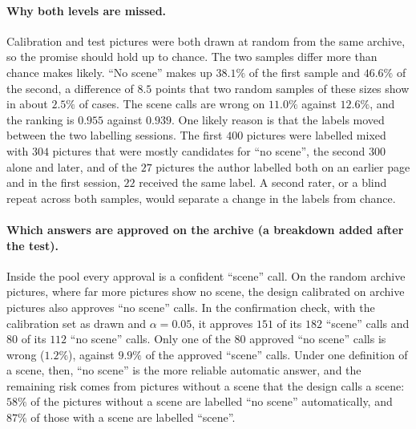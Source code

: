 \paragraph{Why both levels are missed.} Calibration and test pictures were both drawn at random from the same archive, so the promise should hold up to chance. The two samples differ more than chance makes likely. ``No scene'' makes up $38.1\%$ of the first sample and $46.6\%$ of the second, a difference of $8.5$ points that two random samples of these sizes show in about $2.5\%$ of cases. The scene calls are wrong on $11.0\%$ against $12.6\%$, and the ranking is $0.955$ against $0.939$. One likely reason is that the labels moved between the two labelling sessions. The first $400$ pictures were labelled mixed with $304$ pictures that were mostly candidates for ``no scene'', the second $300$ alone and later, and of the $27$ pictures the author labelled both on an earlier page and in the first session, $22$ received the same label. A second rater, or a blind repeat across both samples, would separate a change in the labels from chance.

\paragraph{Which answers are approved on the archive (a breakdown added after the test).} Inside the pool every approval is a confident ``scene'' call. On the random archive pictures, where far more pictures show no scene, the design calibrated on archive pictures also approves ``no scene'' calls. In the confirmation check, with the calibration set as drawn and $\alpha=0.05$, it approves $151$ of its $182$ ``scene'' calls and $80$ of its $112$ ``no scene'' calls. Only one of the $80$ approved ``no scene'' calls is wrong ($1.2\%$), against $9.9\%$ of the approved ``scene'' calls. Under one definition of a scene, then, ``no scene'' is the more reliable automatic answer, and the remaining risk comes from pictures without a scene that the design calls a scene: $58\%$ of the pictures without a scene are labelled ``no scene'' automatically, and $87\%$ of those with a scene are labelled ``scene''.

